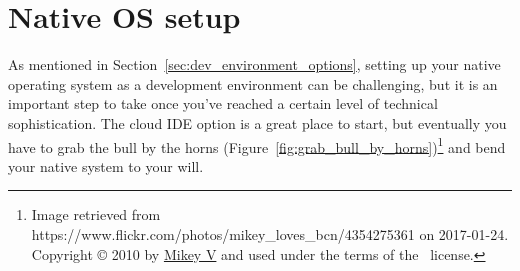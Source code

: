 




\section{Native OS setup} %
\label{sec:native_os_setup}

As mentioned in Section~\ref{sec:dev_environment_options}, setting up your native operating system as a development environment can be challenging, but it is an important step to take once you've reached a certain level of technical sophistication. The cloud IDE option is a great place to start, but eventually you have to grab the bull by the horns (Figure~\ref{fig:grab_bull_by_horns})\footnote{Image retrieved from https://www.flickr.com/photos/mikey\_loves\_bcn/4354275361 on 2017-01-24. Copyright © 2010 by \href{https://www.flickr.com/photos/mikey_loves_bcn/}{Mikey V} and used under the terms of the \ccbync\ license.} and bend your native system to your will.

